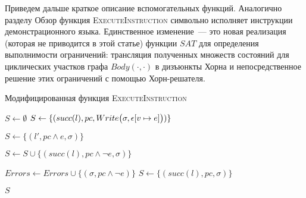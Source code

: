 Приведем дальше краткое описание вспомогательных функций.
Аналогично разделу Обзор функция \textsc{ExecuteInstruction} символьно исполняет инструкции демонстрационного языка. Единственное изменение~--- это новая реализация (которая не приводится в этой статье) функции $SAT$ для определения выполнимости ограничений: трансляция полученных множеств состояний для циклических участков графа $Body(\cdot,\cdot)$ в дизъюнкты Хорна и непосредственное решение этих ограничений с помощью Хорн-решателя.

\begin{algorithm}
    \caption{Модифицированная функция \textsc{ExecuteInstruction}} \label{new_execute_instruction}
\begin{algorithmic}[1]
        \State $S \gets \emptyset$
         \label{alg:execute_instruction_start}
                \State $S \gets \{(succ(l),pc, Write\big(\sigma,\epsilon[v\mapsto e]\big))\}$
            \EndCase

                 \label{alg:sat1}
                    \State $S \gets \{(l', pc \land e, \sigma)\}$
                \EndIf

                 \label{alg:sat2}
                    \State $S \gets S \cup \{(succ(l), pc \land \neg e, \sigma)\}$
                \EndIf
            \EndCase

                 \label{alg:sat3}
                    \State $Errors \gets Errors \cup \{(\sigma, pc \land \neg e)\}$
                \Else
                    \State $S \gets \{(succ(l),pc,\sigma)\}$
                \EndIf
            \EndCase

            \EndCase
        \EndSwitch \label{alg:execute_instruction_end}
        \State \Return $S$
    \EndProcedure
\end{algorithmic}
\end{algorithm}

